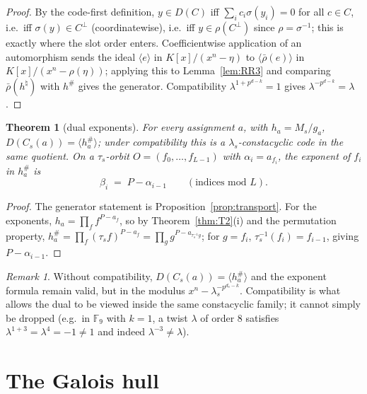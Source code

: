 \documentclass[11pt]{article}
\newtheorem{theorem}{Theorem}[section]
\theoremstyle{definition}
\theoremstyle{remark}
\newtheorem*{remark}{Remark}
\begin{document}
\begin{proof}
By the code-first definition, \(y \in D(C)\) iff
\(\sum_i c_i \sigma(y_i) = 0\) for all \(c \in C\), i.e.\ iff
\(\sigma(y) \in C^\perp\) (coordinatewise), i.e.\ iff
\(y \in \rho(C^\perp)\) since \(\rho = \sigma^{-1}\); this is exactly
where the slot order enters. Coefficientwise application of an
automorphism sends the ideal \(\langle e \rangle\) in
\(K[x]/(x^n-\eta)\) to \(\langle \bar\rho(e)\rangle\) in
\(K[x]/(x^n - \rho(\eta))\); applying this to Lemma~\ref{lem:RR3} and
comparing \(\bar\rho(h^{\natural})\) with \(h^{\#}\) gives the generator.
Compatibility \(\lambda^{1+p^{d-k}}=1\) gives
\(\lambda^{-p^{d-k}} = \lambda\).
\end{proof}

\begin{theorem}[dual exponents]\label{thm:T3}
For every assignment \(a\), with \(h_a = M_s / g_a\),
\(D(C_s(a)) = \langle h_a^{\#} \rangle\); under compatibility this is a
\(\lambda_s\)-constacyclic code in the same quotient. On a
\(\tau_s\)-orbit \(O = (f_0,\dots,f_{L-1})\) with \(\alpha_i = a_{f_i}\),
the exponent of \(f_i\) in \(h_a^{\#}\) is
\[
\beta_i \;=\; P - \alpha_{i-1} \qquad (\text{indices mod } L).
\]
\end{theorem}

\begin{proof}
The generator statement is Proposition~\ref{prop:transport}. For the
exponents, \(h_a = \prod_{f} f^{P - a_f}\), so by Theorem~\ref{thm:T2}(i)
and the permutation property,
\(h_a^{\#} = \prod_f (\tau_s f)^{P-a_f} = \prod_{g} g^{P - a_{\tau_s^{-1} g}}\);
for \(g = f_i\), \(\tau_s^{-1}(f_i) = f_{i-1}\), giving \(P - \alpha_{i-1}\).
\end{proof}

\begin{remark}
Without compatibility, \(D(C_s(a)) = \langle h_a^{\#}\rangle\) and the
exponent formula remain valid, but in the modulus
\(x^n - \lambda_s^{-p^{d_s-k}}\). Compatibility is what allows the dual
to be viewed inside the same constacyclic family; it cannot simply be
dropped (e.g.\ in \(\mathbb{F}_9\) with \(k=1\), a twist \(\lambda\) of
order \(8\) satisfies \(\lambda^{1+3} = \lambda^4 = -1 \ne 1\) and indeed
\(\lambda^{-3} \ne \lambda\)).
\end{remark}

\section{The Galois hull}\label{sec:hull}
\end{document}
